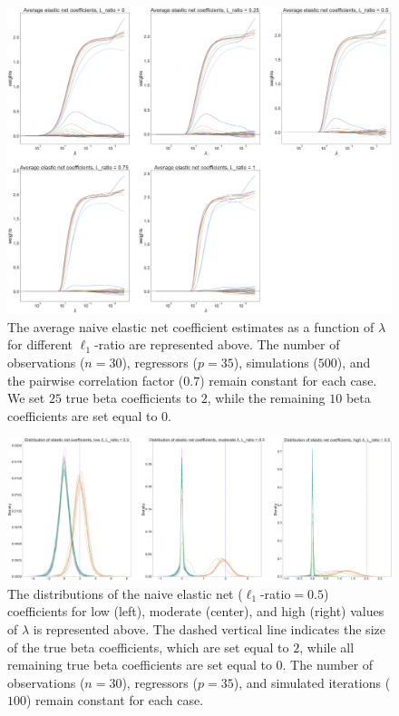 \begin{figure}[H]
        \includegraphics[scale=0.17]{material/Img/elastic_net_plot_average_betas.png}
        \centering
        \caption[Average naive elastic net coefficient estimates]{The average naive elastic net coefficient estimates as a function of $\lambda$ for different $\ell_1$-ratio are represented above. The number of observations ($n=30$), regressors ($p=35$), simulations ($500$), and the pairwise correlation factor ($0.7$) remain constant for each case. We set $25$ true beta coefficients to $2$, while the remaining $10$ beta coefficients are set equal to $0$.}
        \label{fig:elnet_avg_betas}
\end{figure}
    
\begin{figure}[H]
        \includegraphics[scale=0.11]{material/Img/elastic_net_shrunken_beta_dist_35_0.5.png}
        \centering
        \caption[Distribution of naive elastic net coefficients]{The distributions of the naive elastic net ($\ell_1$-ratio$ = 0.5$) coefficients for low (left), moderate (center), and high (right) values of $\lambda$ is represented above. The dashed vertical line indicates the size of the true beta coefficients, which are set equal to $2$, while all remaining true beta coefficients are set equal to $0$. The number of observations ($n=30$), regressors ($p=35$), and simulated iterations ($100$) remain constant for each case.}
\label{fig:elnet_shrunken_betas}
\end{figure}
    
